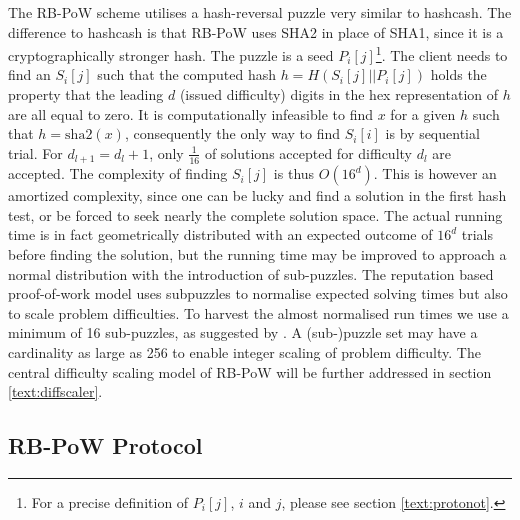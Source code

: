 The RB-PoW scheme utilises a hash-reversal puzzle very similar to hashcash. The difference to hashcash is that RB-PoW uses SHA2 in place of SHA1, since it is a cryptographically stronger hash\cite{nistsha1}.
The puzzle is a seed $P_i[j]$\footnote{For a precise definition of $P_i[j]$, $i$ and $j$, please see section \ref{text:protonot}.}. The client needs to find an $S_i[j]$ such that the computed hash $ h = H(S_i[j]||P_i[j])$ holds the property that the leading $d$ (issued difficulty) digits in the hex representation of $h$ are all equal to zero. 
It is computationally infeasible to find $x$  for a given $h$ such that $ h = \mbox{sha2}(x)$\cite{sha2}, consequently the only way to find $S_i[i]$ is by sequential trial. For $d_{l+1} = d_l + 1 $, only $\frac{1}{16}$ of solutions accepted for difficulty $d_l$ are accepted.
The complexity of finding $S_i[j]$ is thus $O(16^d)$. This is however an amortized complexity, since one can be lucky and find a solution in the first hash test, or be forced to seek nearly the complete solution space.
The actual running time is in fact geometrically distributed with an expected outcome of $16^d$ trials before finding the solution, but the running time may be improved to approach a normal distribution with the introduction of sub-puzzles\cite{subpuzzles}. 
The reputation based proof-of-work model uses subpuzzles to normalise expected solving times but also to scale problem difficulties. To harvest the almost normalised run times we use a minimum of 16 sub-puzzles, as suggested by \citeauthor{subpuzzles}. A (sub-)puzzle set may have a cardinality as large as 256 to enable integer scaling of problem difficulty. The central difficulty scaling model of RB-PoW will be further addressed in section \ref{text:diffscaler}.

\subsection{RB-PoW Protocol}


